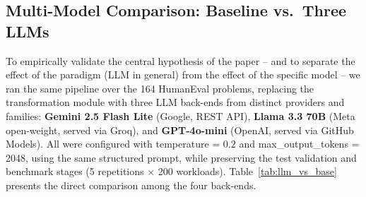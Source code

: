 \documentclass[conference]{IEEEtran}
\begin{document}
\subsection{Multi-Model Comparison: Baseline vs.\ Three LLMs}
\label{sec:llmvsbase}

To empirically validate the central hypothesis of the paper -- and to separate the effect of the paradigm (LLM in general) from the effect of the specific model -- we ran the same pipeline over the 164 HumanEval problems, replacing the transformation module with three LLM back-ends from distinct providers and families: \textbf{Gemini 2.5 Flash Lite} (Google, REST API), \textbf{Llama 3.3 70B} (Meta open-weight, served via Groq), and \textbf{GPT-4o-mini} (OpenAI, served via GitHub Models). All were configured with temperature = $0.2$ and max\_output\_tokens = 2048, using the same structured prompt, while preserving the test validation and benchmark stages (5 repetitions $\times$ 200 workloads). Table~\ref{tab:llm_vs_base} presents the direct comparison among the four back-ends.
\end{document}
